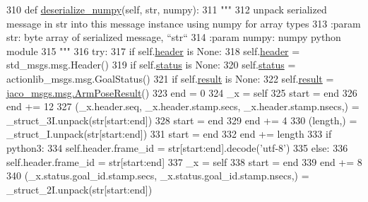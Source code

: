 \begin{DoxyCode}
310   \textcolor{keyword}{def }\hyperlink{classjaco__msgs_1_1msg_1_1__ArmPoseActionResult_1_1ArmPoseActionResult_a32c659d486a7a260933ae8ce72a2fcb7}{deserialize\_numpy}(self, str, numpy):
311     \textcolor{stringliteral}{"""}
312 \textcolor{stringliteral}{    unpack serialized message in str into this message instance using numpy for array types}
313 \textcolor{stringliteral}{    :param str: byte array of serialized message, ``str``}
314 \textcolor{stringliteral}{    :param numpy: numpy python module}
315 \textcolor{stringliteral}{    """}
316     \textcolor{keywordflow}{try}:
317       \textcolor{keywordflow}{if} self.\hyperlink{classjaco__msgs_1_1msg_1_1__ArmPoseActionResult_1_1ArmPoseActionResult_a91cd51f43f8421923ec5cdfbfd6a340f}{header} \textcolor{keywordflow}{is} \textcolor{keywordtype}{None}:
318         self.\hyperlink{classjaco__msgs_1_1msg_1_1__ArmPoseActionResult_1_1ArmPoseActionResult_a91cd51f43f8421923ec5cdfbfd6a340f}{header} = std\_msgs.msg.Header()
319       \textcolor{keywordflow}{if} self.\hyperlink{classjaco__msgs_1_1msg_1_1__ArmPoseActionResult_1_1ArmPoseActionResult_ab5014de96d390234ceea56bed94a106b}{status} \textcolor{keywordflow}{is} \textcolor{keywordtype}{None}:
320         self.\hyperlink{classjaco__msgs_1_1msg_1_1__ArmPoseActionResult_1_1ArmPoseActionResult_ab5014de96d390234ceea56bed94a106b}{status} = actionlib\_msgs.msg.GoalStatus()
321       \textcolor{keywordflow}{if} self.\hyperlink{classjaco__msgs_1_1msg_1_1__ArmPoseActionResult_1_1ArmPoseActionResult_a6debdadfdee3118c370d0a82f62c56ee}{result} \textcolor{keywordflow}{is} \textcolor{keywordtype}{None}:
322         self.\hyperlink{classjaco__msgs_1_1msg_1_1__ArmPoseActionResult_1_1ArmPoseActionResult_a6debdadfdee3118c370d0a82f62c56ee}{result} = \hyperlink{classjaco__msgs_1_1msg_1_1__ArmPoseResult_1_1ArmPoseResult}{jaco\_msgs.msg.ArmPoseResult}()
323       end = 0
324       \_x = self
325       start = end
326       end += 12
327       (\_x.header.seq, \_x.header.stamp.secs, \_x.header.stamp.nsecs,) = \_struct\_3I.unpack(str[start:end])
328       start = end
329       end += 4
330       (length,) = \_struct\_I.unpack(str[start:end])
331       start = end
332       end += length
333       \textcolor{keywordflow}{if} python3:
334         self.header.frame\_id = str[start:end].decode(\textcolor{stringliteral}{'utf-8'})
335       \textcolor{keywordflow}{else}:
336         self.header.frame\_id = str[start:end]
337       \_x = self
338       start = end
339       end += 8
340       (\_x.status.goal\_id.stamp.secs, \_x.status.goal\_id.stamp.nsecs,) = \_struct\_2I.unpack(str[start:end])

\end{DoxyCode}
